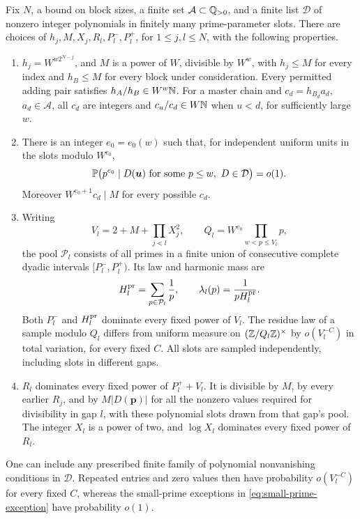 \begin{lemma}\label{lem:master-scales}
Fix \(N\), a bound on block sizes, a finite set
\(\mathcal A\subset\mathbb Q_{>0}\), and a finite list \(\mathcal D\) of
nonzero integer polynomials in finitely many prime-parameter slots.
There are choices of \(h_j,M,X_j,R_l,P_l^-,P_l^+\), for
\(1\le j,l\le N\), with the following properties.
\begin{enumerate}
\item
\(h_j=W^{w2^{N-j}}\), and \(M\) is a power of \(W\), divisible by
\(W^w\), with \(h_j\le M\) for every index and \(h_B\le M\)
for every block under consideration.
Every permitted adding pair satisfies
\(h_A/h_B\in W^w\mathbb N\).  For a master chain and
\(c_d=h_{B_d}a_d\), \(a_d\in\mathcal A\), all \(c_d\) are integers
and \(c_u/c_d\in W\mathbb N\) when \(u<d\), for sufficiently large \(w\).
\item
There is an integer \(e_0=e_0(w)\) such that, for independent uniform
units in the slots modulo \(W^{e_0}\),
\begin{equation}\label{eq:small-prime-exception}
 \mathbb P\bigl(p^{e_0}\mid D(\boldsymbol u)
       \text{ for some }p\le w,\ D\in\mathcal D\bigr)=o(1).
\end{equation}
Moreover \(W^{e_0+1}c_d\mid M\) for every possible \(c_d\).
\item
Writing
\[
 V_l=2+M+\prod_{j<l}X_j^2,
 \qquad
 Q_l=W^{e_0}\prod_{w<p\le V_l}p,
\]
the pool \(\mathcal P_l\) consists of all primes in a finite union of
consecutive complete dyadic intervals
\([P_l^-,P_l^+)\).  Its law and harmonic mass are
\begin{equation}\label{eq:prime-pool-law}
 H_l^{\rm pr}=\sum_{p\in\mathcal P_l}\frac1p,
 \qquad \lambda_l(p)=\frac1{pH_l^{\rm pr}}.
\end{equation}
Both \(P_l^-\) and \(H_l^{\rm pr}\) dominate every fixed power of
\(V_l\).  The residue law of a sample modulo \(Q_l\) differs from
uniform measure on \((\mathbb Z/Q_l\mathbb Z)^\times\) by
\(o(V_l^{-C})\) in total variation, for every fixed \(C\).
All slots are sampled independently, including slots in different gaps.
\item
\(R_l\) dominates every fixed power of \(P_l^++V_l\).  It is divisible
by \(M\), by every earlier \(R_j\), and by
\(M|D(\boldsymbol p)|\) for all the nonzero values required for
divisibility in gap \(l\), with these polynomial slots drawn from
that gap's pool.  The integer \(X_l\) is a power of two, and \(\log X_l\)
dominates every fixed power of \(R_l\).
\end{enumerate}
One can include any prescribed finite family of polynomial nonvanishing
conditions in \(\mathcal D\).  Repeated entries and zero values then
have probability \(o(V_l^{-C})\) for every fixed \(C\), whereas the
small-prime exceptions in \eqref{eq:small-prime-exception} have
probability \(o(1)\).
\end{lemma}

